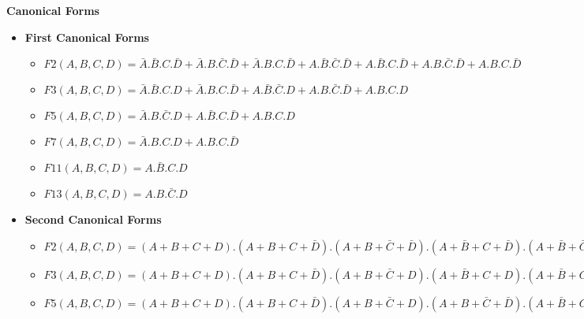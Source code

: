 \textbf{Canonical Forms }
\begin{itemize}
\item \textbf{First Canonical Forms }
    \begin{itemize}
    
        \item $F2(A,B,C,D) =  \bar A.\bar B.C.\bar D + \bar A.B.\bar C.\bar D + \bar A.B.C.\bar D + A.\bar B.\bar C.\bar D + A.\bar B.C.\bar D + A.B.\bar C.\bar D + A.B.C.\bar D$
    
        \item $F3(A,B,C,D) =  \bar A.\bar B.C.D + \bar A.B.C.\bar D + A.\bar B.\bar C.D + A.B.\bar C.\bar D + A.B.C.D$
    
        \item $F5(A,B,C,D) =  \bar A.B.\bar C.D + A.\bar B.C.\bar D + A.B.C.D$
    
        \item $F7(A,B,C,D) =  \bar A.B.C.D + A.B.C.\bar D$
    
        \item $F11(A,B,C,D) =  A.\bar B.C.D$
    
        \item $F13(A,B,C,D) =  A.B.\bar C.D$
    
    \end{itemize}

\item \textbf{Second Canonical Forms }
    \begin{itemize}
    
        \item $F2(A,B,C,D) =  (A+B+C+D) . (A+B+C+\bar D) . (A+B+\bar C+\bar D) . (A+\bar B+C+\bar D) . (A+\bar B+\bar C+\bar D) . (\bar A+B+C+\bar D) . (\bar A+B+\bar C+\bar D) . (\bar A+\bar B+C+\bar D) . (\bar A+\bar B+\bar C+\bar D)$
    
        \item $F3(A,B,C,D) =  (A+B+C+D) . (A+B+C+\bar D) . (A+B+\bar C+D) . (A+\bar B+C+D) . (A+\bar B+C+\bar D) . (A+\bar B+\bar C+\bar D) . (\bar A+B+C+D) . (\bar A+B+\bar C+D) . (\bar A+B+\bar C+\bar D) . (\bar A+\bar B+C+\bar D) . (\bar A+\bar B+\bar C+D)$
    
        \item $F5(A,B,C,D) =  (A+B+C+D) . (A+B+C+\bar D) . (A+B+\bar C+D) . (A+B+\bar C+\bar D) . (A+\bar B+C+D) . (A+\bar B+\bar C+D) . (A+\bar B+\bar C+\bar D) . (\bar A+B+C+D) . (\bar A+B+C+\bar D) . (\bar A+B+\bar C+\bar D) . (\bar A+\bar B+C+D) . (\bar A+\bar B+C+\bar D) . (\bar A+\bar B+\bar C+D)$
    

\end{itemize}
\end{itemize}
